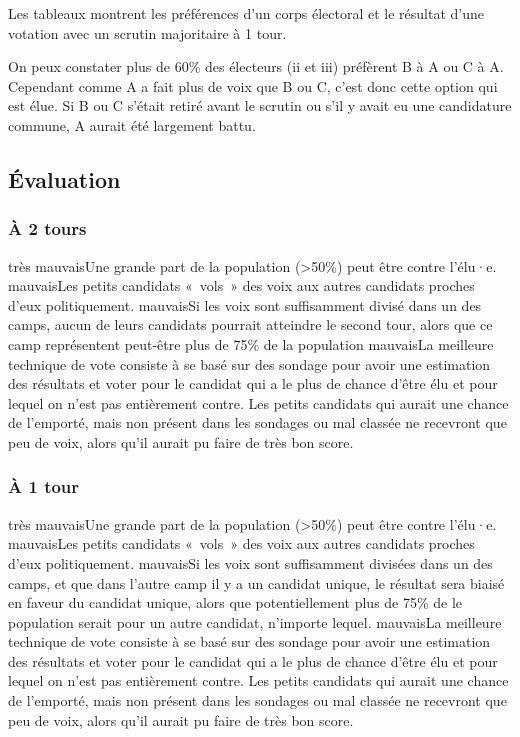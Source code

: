 \documentclass[../report]{subfiles}
\begin{document}
  Les tableaux  montrent les préférences d'un corps 
  électoral et le résultat d'une votation avec un scrutin majoritaire à 1 tour.

  On peux constater plus de 60\% des électeurs (ii et iii) préfèrent B à A ou C à A. 
  Cependant comme A a fait plus de voix que B ou C, c'est donc cette option qui est élue.
  Si B ou C s'était retiré avant le scrutin ou s'il y avait eu une candidature commune, A aurait été largement battu. 

  \subsection{Évaluation}
  \subsubsection{À 2 tours}
  \tabcritere%
    {très mauvais}{Une grande part de la population (>50\%) peut être contre l'élu·e.}%
    {mauvais}{Les petits candidats «~vols~» des voix aux autres candidats proches d'eux politiquement.}%
    {mauvais}{Si les voix sont suffisamment divisé dans un des camps, aucun de leurs candidats pourrait atteindre le second tour, alors que ce camp représentent peut-être plus de 75\% de la population}%
    {mauvais}{La meilleure technique de vote consiste à se basé sur des sondage pour avoir une estimation des résultats et voter pour le candidat qui a le plus de chance d'être élu et pour lequel on n'est pas entièrement contre. Les petits candidats qui aurait une chance de l'emporté, mais non présent dans les sondages ou mal classée ne recevront que peu de voix, alors qu'il aurait pu faire de très bon score.}

  \subsubsection{À 1 tour}
  \tabcritere%
    {très mauvais}{Une grande part de la population (>50\%) peut être contre l'élu·e.}%
    {mauvais}{Les petits candidats «~vols~» des voix aux autres candidats proches d'eux politiquement.}%
    {mauvais}{Si les voix sont suffisamment divisées dans un des camps, et que dans l'autre camp il y a un candidat unique, le résultat sera biaisé en faveur du candidat unique, alors que potentiellement plus de 75\% de le population serait pour un autre candidat, n'importe lequel.}%
    {mauvais}{La meilleure technique de vote consiste à se basé sur des sondage pour avoir une estimation des résultats et voter pour le candidat qui a le plus de chance d'être élu et pour lequel on n'est pas entièrement contre. Les petits candidats qui aurait une chance de l'emporté, mais non présent dans les sondages ou mal classée ne recevront que peu de voix, alors qu'il aurait pu faire de très bon score.}
    
\end{document}
